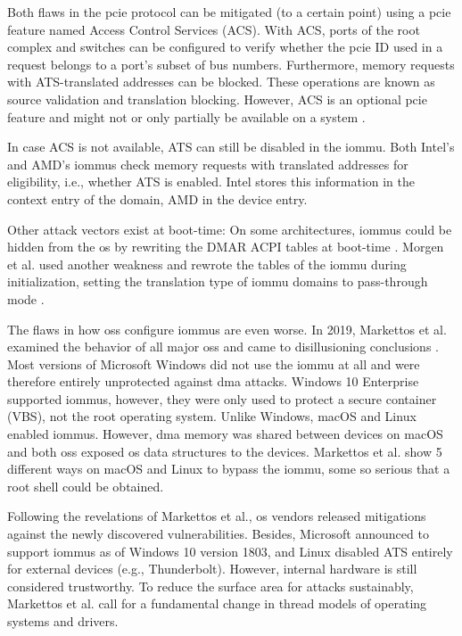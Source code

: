 Both flaws in the \ac{pcie} protocol can be mitigated (to a certain point) using
a \ac{pcie} feature named Access Control Services (ACS). With ACS, ports of the
root complex and switches can be configured to verify whether the \ac{pcie} ID
used in a request belongs to a port's subset of bus numbers. Furthermore, memory
requests with ATS-translated addresses can be blocked. These operations are
known as source validation and translation blocking. However, ACS is an optional
\ac{pcie} feature and might not or only partially be available on a system
\cite[p.~582]{pcie2017specification}.

In case ACS is not available, ATS can still be disabled in the \ac{iommu}. Both
Intel's and AMD's \acp{iommu} check memory requests with translated addresses
for eligibility, i.e., whether ATS is enabled. Intel stores this information in
the context entry of the domain, AMD in the device entry.

Other attack vectors exist at boot-time: On some architectures, \acp{iommu}
could be hidden from the \ac{os} by rewriting the DMAR ACPI tables at boot-time
\cite{wojtczuk2009another}. Morgen et al. used another weakness and rewrote the
tables of the \ac{iommu} during initialization, setting the translation type of
\ac{iommu} domains to pass-through mode \cite{morgan2018iommu}.

The flaws in how \aclp{os} configure \acp{iommu} are even worse. In 2019,
Markettos et al. examined the behavior of all major \acp{os} and came to
disillusioning conclusions \cite{markettos2019thunderclap}. Most versions of
Microsoft Windows did not use the \ac{iommu} at all and were therefore entirely
unprotected against \ac{dma} attacks. Windows 10 Enterprise supported
\acp{iommu}, however, they were only used to protect a secure container (VBS),
not the root operating system. Unlike Windows, macOS and Linux enabled
\acp{iommu}. However, \ac{dma} memory was shared between devices on macOS and
both \aclp{os} exposed \ac{os} data structures to the devices. Markettos et al.
show 5 different ways on macOS and Linux to bypass the \ac{iommu}, some so
serious that a root shell could be obtained.

Following the revelations of Markettos et al., \ac{os} vendors released
mitigations against the newly discovered vulnerabilities. Besides, Microsoft
announced to support \acp{iommu} as of Windows 10 version 1803, and Linux
disabled ATS entirely for external devices (e.g., Thunderbolt). However,
internal hardware is still considered trustworthy. To reduce the surface area
for attacks sustainably, Markettos et al. call for a fundamental change in
thread models of operating systems and drivers.


